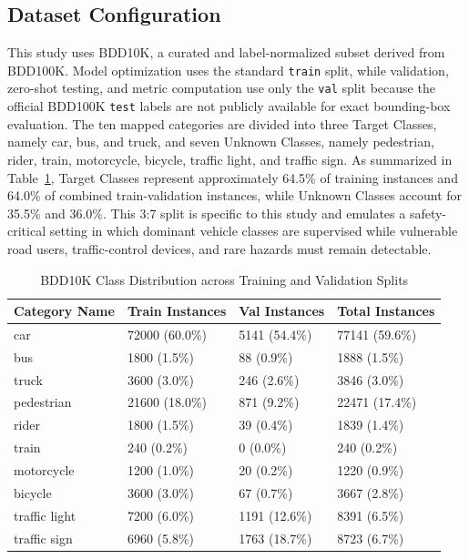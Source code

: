 \documentclass[conference]{IEEEtran}
\begin{document}
\subsection{Dataset Configuration}
This study uses BDD10K, a curated and label-normalized subset derived from BDD100K. Model optimization uses the standard \texttt{train} split, while validation, zero-shot testing, and metric computation use only the \texttt{val} split because the official BDD100K \texttt{test} labels are not publicly available for exact bounding-box evaluation. The ten mapped categories are divided into three Target Classes, namely car, bus, and truck, and seven Unknown Classes, namely pedestrian, rider, train, motorcycle, bicycle, traffic light, and traffic sign. As summarized in Table~\ref{tab:bdd10k_class_distribution}, Target Classes represent approximately 64.5\% of training instances and 64.0\% of combined train-validation instances, while Unknown Classes account for 35.5\% and 36.0\%. This 3:7 split is specific to this study and emulates a safety-critical setting in which dominant vehicle classes are supervised while vulnerable road users, traffic-control devices, and rare hazards must remain detectable.

\begin{table}[htbp]
\caption{BDD10K Class Distribution across Training and Validation Splits}
\begin{center}
\begin{tabular}{|l|l|l|l|}
\hline
\textbf{Category Name} & \textbf{Train Instances} & \textbf{Val Instances} & \textbf{Total Instances} \\
\hline
car & 72000 (60.0\%) & 5141 (54.4\%) & 77141 (59.6\%) \\
bus & 1800 (1.5\%) & 88 (0.9\%) & 1888 (1.5\%) \\
truck & 3600 (3.0\%) & 246 (2.6\%) & 3846 (3.0\%) \\
pedestrian & 21600 (18.0\%) & 871 (9.2\%) & 22471 (17.4\%) \\
rider & 1800 (1.5\%) & 39 (0.4\%) & 1839 (1.4\%) \\
train & 240 (0.2\%) & 0 (0.0\%) & 240 (0.2\%) \\
motorcycle & 1200 (1.0\%) & 20 (0.2\%) & 1220 (0.9\%) \\
bicycle & 3600 (3.0\%) & 67 (0.7\%) & 3667 (2.8\%) \\
traffic light & 7200 (6.0\%) & 1191 (12.6\%) & 8391 (6.5\%) \\
traffic sign & 6960 (5.8\%) & 1763 (18.7\%) & 8723 (6.7\%) \\
\hline
\end{tabular}
\label{tab:bdd10k_class_distribution}
\end{center}
\end{table}
\end{document}
